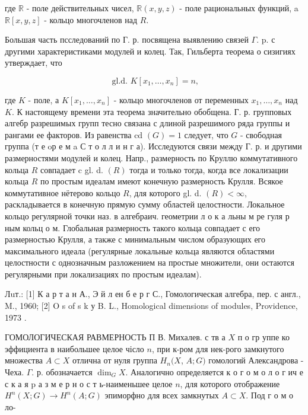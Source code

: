 \documentclass[10pt]{article}
\begin{document}
где $\mathbb{R}$ - поле действительных чисел, $\mathbb{R}(x, y, z)$ - поле рациональных функций, a $\mathbb{R}[x, y, z]$ - кольцо многочленов над $R$.



Большая часть псследований по Г. р. посвящена выявлению связей $\Gamma$. p. с другими характеристиками модулей и колец. Так, Гильберта теорема о сизигиях утверждает, что



\[

\text { gl.d. } K\left[x_{1}, \ldots, x_{n}\right]=n,

\]



где $K$ - поле, а $K\left[x_{1}, \ldots, x_{n}\right]$ - кольцо многочленов от переменных $x_{1}, \ldots, x_{n}$ над $K$. К настоящему времени эта теорема значительно обобщена. Г. р. групповых алгебр разрешимых групп тесно связана с длиной разрешимого ряда группы и рангами ее факторов. Из равенства cd $(G)=1$ следует, что $G$ - свободная группа (т е oр е м a С т о л л и н г а). Исследуются связи между Г. р. и другими размерностями модулей и колец. Напр., размерность по Круллю коммутативного кольца $R$ совпадает c gl. d. $(R)$ тогда и только тогда, когда все локализации кольца $R$ по простым идеалам имеют конечную размерность Крулля. Всякое коммутативное нётерово кольцо $R$, для которого gl. d. $(R)<\infty$, раскладывается в конечную прямую сумму областей целостности. Локальное кольцо регулярной точки наз. в алгебраич. геометрии л о к а льны м ре гуля р ным кольц о м. Глобальная размерность такого кольца совпадает с его размерностью Крулля, а также с минимальным числом образующих его максимального идеала (регулярные локальные кольца являются областями целостности с однозначным разложением на простые множители, они остаются регулярными при локализациях по простым идеалам).



Лuт.: [1] К а р т а н А., Э й л ен б е р г С., Гомологическая алгебра, пер. с англ., M., 1960; [2] O s of s k у B. L., Homological dimensions of modules, Providence, 1973 .



ГОМОЛОГИЧЕСКАЯ РАВМЕРНОСТЬ П В. Михалев. с тв а $X$ п о гр уппе ко эффициента в наибольшее целое чісло $n$, при к-ром для нек-рого замкнутого множества $A \subset X$ отлична от нуля группа $H_{n}(X$, $A ; G)$ гомологий Александрова - Чеха. $\Gamma$. р. обозначается $\operatorname{dim}_{G} X$. Аналогично определяется к о г о м о л о г ич е с к а я $\mathrm{p}$ а з м е р н о с т ь-наименьшее целое $n$, для которого отображение $H^{n}(X ; G) \rightarrow H^{n}(A ; G)$ эпиморфно для всех замкнутых $A \subset X$. Под $г$ о м о ло-
\end{document}
